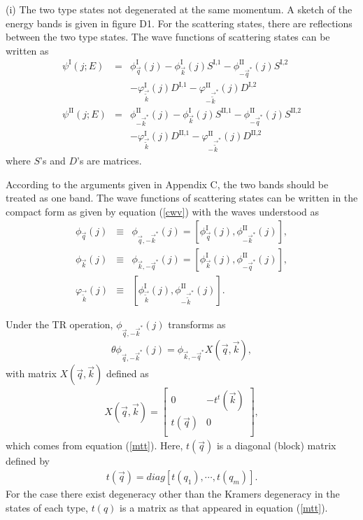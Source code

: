 \documentclass[aps,pra,amsmath,twocolumn,showpacs,bibnotes,10pt]{revtex4-1}
\begin{document}
(i) The two type states not degenerated at the same momentum. A sketch of the energy bands is given in figure D1. For the scattering states, there are reflections between the two type states. The wave functions of scattering states can be written as
\begin{eqnarray}
\psi^{\text{I}}(j;E) &=& \phi^{\text{I}}_{\vec q}(j)-\phi^{\text{I}}_{\vec k}(j)S^{\text{I,1}}  
-\phi^{\text{II}}_{-\vec q^{\ast}}(j)S^{\text{I,2}}\nonumber\\
&& -\varphi^{\text{I}}_{\vec{\tilde k}}(j)D^{\text{I,1}}-\varphi^{\text{II}}_{-{\vec{\tilde k}}^{\ast}}(j)D^{\text{I,2}}  \nonumber\\
\psi^{\text{II}}(j;E) &=& \phi^{\text{II}}_{-\vec k^{\ast}}(j)-\phi^{\text{I}}_{\vec k}(j)S^{\text{II,1}}  
-\phi^{\text{II}}_{-\vec q^{\ast}}(j)S^{\text{II,2}}   \nonumber \\
&& -\varphi^{\text{I}}_{\vec{\tilde k}}(j)D^{\text{II,1}}-\varphi^{\text{II}}_{-{\vec{\tilde k}}^{\ast}}(j)D^{\text{II,2}}  \nonumber 
\end{eqnarray}
where $S$'s and $D$'s are matrices.

According to the arguments given in Appendix C, the two bands should be treated as one band. The wave functions of scattering states can be written in the compact form as given by equation (\ref{cwv})  
with the waves understood as
\begin{eqnarray}
\phi_{\vec q}(j) &\equiv& \phi_{\vec q,-\vec k^{\ast}}(j) = [\phi^{\text{I}}_{\vec q}(j), \phi^{\text{II}}_{-\vec k^{\ast}}(j)],
\label{wvct} \\
\phi_{\vec k}(j) &\equiv& \phi_{\vec k,-\vec q^{\ast}}(j) = [\phi^{\text{I}}_{\vec k}(j), \phi^{\text{II}}_{-\vec q^{\ast}}(j)],
\nonumber\\
\varphi_{\vec{\tilde k}}(j) &\equiv& [\phi^{\text{I}}_{\vec{\tilde k}}(j), \phi^{\text{II}}_{-{\vec{\tilde k}}^{\ast}}(j)]. \nonumber
\end{eqnarray}

Under the TR operation, $\phi_{\vec q,-\vec k^{\ast}}(j)$ transforms as
\begin{eqnarray}
\theta \phi_{\vec q,-\vec k^{\ast}}(j) = \phi_{\vec k,-\vec q^{\ast}}X(\vec q,\vec k),  \label{eqb1}
\end{eqnarray}
with matrix $X(\vec q,\vec k)$ defined as 
\begin{eqnarray}
X(\vec q,\vec k) = \begin{bmatrix}
	0&-t^{t}(\vec k)\\
	t(\vec q)&0\\
\end{bmatrix}, \label{mtxx}  
\end{eqnarray}
which comes from equation (\ref{mtt}). Here, $t(\vec q)$ is a diagonal (block) matrix defined by
\begin{eqnarray}
t(\vec q) = diag[t(q_1),\cdots,t(q_m)].   \nonumber
\end{eqnarray}
For the case there exist degeneracy other than the Kramers degeneracy in the states of each type, $t(q)$ is a matrix as that appeared in equation (\ref{mtt}). 
\end{document}
